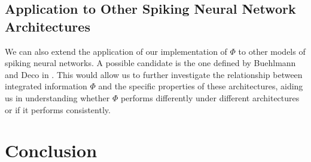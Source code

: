 \documentclass[a4paper,11pt]{article}
\begin{document}
\subsection{Application to Other Spiking Neural Network Architectures}
\label{sec:fw:snn}
We can also extend the application of our implementation of $\Phi$ to other models of spiking neural networks. A possible candidate is the one defined by Buehlmann and Deco in \cite{Buehlmann2010}. This would allow us to further investigate the relationship between integrated information $\Phi$ and the specific properties of these architectures, aiding us in understanding whether $\Phi$ performs differently under different architectures or if it performs consistently.

\clearpage

\section{Conclusion}
\label{sec:conclusion}


\clearpage


{}
\clearpage
\end{document}

